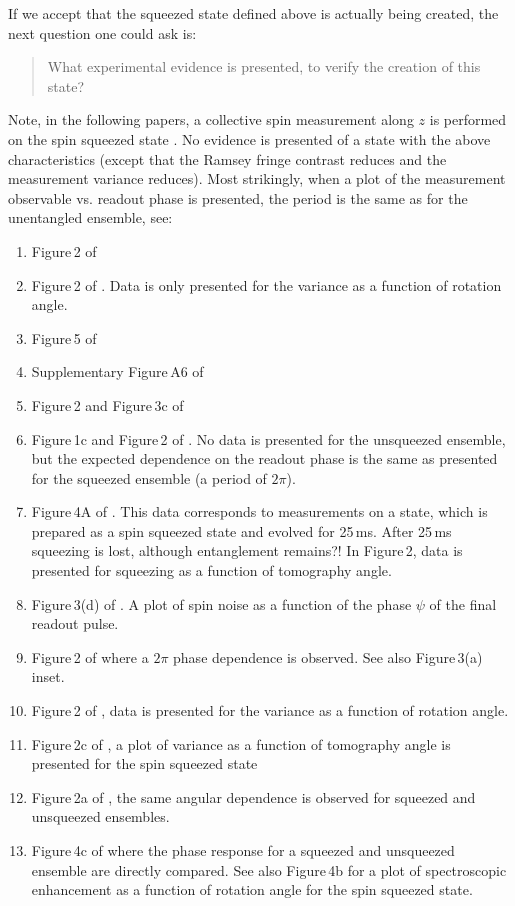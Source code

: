 \documentclass[reqno]{amsart}
\begin{document}
If we accept that the squeezed state defined above is actually being created, the next question one could ask is:
\begin{quotation}
What experimental evidence is presented, to verify the creation of this state?
\end{quotation}

Note, in the following papers, a collective spin measurement along $z$ is performed on the spin squeezed state \cite{Appel2009, Gross2010, Leroux2010, Leroux2010a, LouchetChauvet2010, SchleierSmith2010, Bohnet2014, Muessel2014, Strobel2014, Cox2016, Hosten2016, Linnemann2016, Braverman2019, Malia2020, Bao2020, PedrozoPenafiel2020, Greve2022, Malia2022, Riedel2010, Hosten2016a, Colombo2022}. No evidence is presented of a state with the above characteristics (except that the Ramsey fringe contrast reduces and the measurement variance reduces). Most strikingly, when a plot of the measurement observable vs. readout phase is presented, the period is the same as for the unentangled ensemble, see:
\begin{enumerate}
\item Figure\,2 of \cite{Gross2010}
\item Figure\,2 of \cite{Leroux2010}. Data is only presented for the variance as a function of rotation angle.
\item Figure\,5 of \cite{LouchetChauvet2010}
\item Supplementary Figure\,A6 of \cite{SchleierSmith2010}
\item Figure\,2 and Figure\,3c of \cite{Bohnet2014}
\item Figure\,1c and Figure\,2 of \cite{Muessel2014}. No data is presented for the unsqueezed ensemble, but the expected dependence on the readout phase is the same as presented for the squeezed ensemble (a period of $2\pi$).
\item Figure\,4A of \cite{Strobel2014}. This data corresponds to measurements on a state, which is prepared as a spin squeezed state and evolved for 25\,ms. After 25\,ms squeezing is lost, although entanglement remains?! In Figure\,2, data is presented for squeezing as a function of tomography angle. 
\item Figure\,3(d) of \cite{Cox2016}. A plot of spin noise as a function of the phase $\psi$ of the final readout pulse.
\item Figure\,2 of \cite{Linnemann2016} where a $2\pi$ phase dependence is observed. See also Figure\,3(a) inset.
\item Figure\,2 of \cite{Braverman2019}, data is presented for the variance as a function of rotation angle.
\item Figure\,2c of \cite{PedrozoPenafiel2020}, a plot of variance as a function of tomography angle is presented for the spin squeezed state
\item Figure\,2a of \cite{Riedel2010}, the same angular dependence is observed for squeezed and unsqueezed ensembles.
\item Figure\,4c of \cite{Colombo2022} where the phase response for a squeezed and unsqueezed ensemble are directly compared. See also Figure\,4b for a plot of spectroscopic enhancement as a function of rotation angle for the spin squeezed state.
\end{enumerate}
\end{document}
